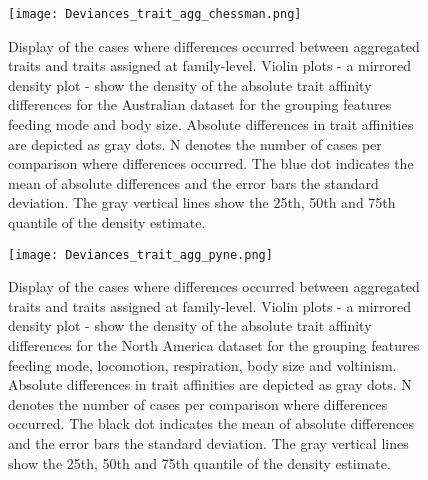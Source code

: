 \documentclass[../Draft_harmonization_paper.tex]{subfiles}
\begin{document}
\newpage

\begin{figure}[H]
  \centering
  \texttt{[image: Deviances\_trait\_agg\_chessman.png]}
  \caption{Display of the cases where differences occurred between aggregated traits and traits assigned at family-level. Violin plots - a mirrored density plot - show the density of the absolute trait affinity differences for the Australian dataset for the grouping features feeding mode and body size. Absolute differences in trait affinities are depicted as gray dots. N denotes the number of cases per comparison where differences occurred. The blue dot indicates the mean of absolute differences and the error bars the standard deviation. The gray vertical lines show the 25th, 50th and 75th quantile of the density estimate.}
  \label{fig:diff_aggr_traits_chessman}
\end{figure}


\begin{figure}[H]
  \centering
  \texttt{[image: Deviances\_trait\_agg\_pyne.png]}
  \caption{Display of the cases where differences occurred between aggregated traits and traits assigned at family-level. Violin plots - a mirrored density plot - show the density of the absolute trait affinity differences for the North America dataset for the grouping features feeding mode, locomotion, respiration, body size and voltinism. Absolute differences in trait affinities are depicted as gray dots. N denotes the number of cases per comparison where differences occurred. The black dot indicates the mean of absolute differences and the error bars the standard deviation. The gray vertical lines show the 25th, 50th and 75th quantile of the density estimate.}
  \label{fig:diff_aggr_traits_pyne}
\end{figure}


\end{document}
